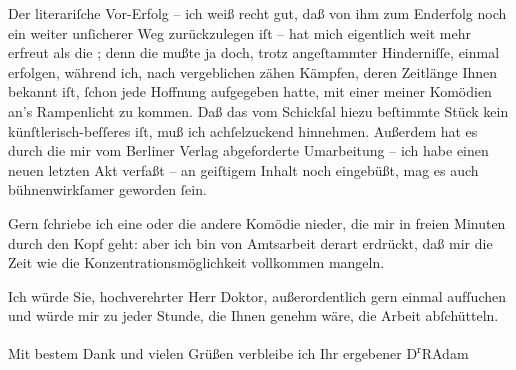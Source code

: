 \pstart
           Der literariſche Vor-Erfolg – ich weiß recht gut, daß von ihm zum Enderfolg noch ein
               weiter unſicherer Weg zurückzulegen iſt – hat mich eigentlich weit mehr erfreut als
               die \label{K_L02538-1v}\label{K_L02538-1}; denn die mußte ja doch, trotz
               angeſtammter Hinderniſſe, einmal erfolgen, während ich, nach vergeblichen zähen
               Kämpfen, deren Zeitlänge Ihnen bekannt iſt, ſchon jede Hoffnung aufgegeben hatte, mit
               einer meiner Komödien an’s Rampenlicht zu kommen. Daß das vom Schickſal hiezu
               beſtimmte Stück kein
               künſtlerisch-beſſeres iſt, muß ich achſelzuckend hinnehmen. Außerdem hat es durch die
               mir vom Berliner Verlag abgeforderte Umarbeitung – ich habe einen neuen
               letzten Akt verfaßt – an geiſtigem Inhalt noch eingebüßt, mag es auch bühnenwirkſamer
               geworden ſein.\pend
           
\pstart
           Gern ſchriebe ich eine oder die andere Komödie {\pb}nieder, die mir in freien Minuten durch
               den Kopf geht: aber ich bin von Amtsarbeit derart erdrückt, daß mir die Zeit wie die
               Konzentrationsmöglichkeit vollkommen mangeln.\pend
           
\pstart
           Ich würde Sie, hochverehrter Herr Doktor, außerordentlich gern einmal aufſuchen und
               würde mir zu jeder Stunde, die Ihnen genehm wäre, die Arbeit abſchütteln.\pend
           
\pstart
           Mit bestem Dank und vielen Grüßen verbleibe ich Ihr ergebener\pend
           \pstart \spacefill\mbox{D\textsuperscript{r}RAdam}\pend{}\endnumbering{}  
      